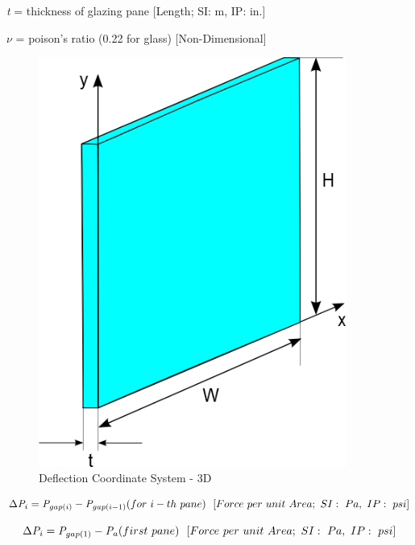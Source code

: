 \emph{t} = thickness of glazing pane {[}Length; SI: m, IP: in.{]}

$\nu$ = poison's ratio (0.22 for glass) {[}Non-Dimensional{]}

\begin{figure}[hbtp] %
\centering
\includegraphics[width=0.9\textwidth, height=0.9\textheight, keepaspectratio=true]{media/image1782.png}
\caption{Deflection Coordinate System - 3D \protect \label{fig:deflection-coordinate-system-3d}}
\end{figure}

\begin{equation}
\emph{\(\Delta\)P\(_{i}\)} = \emph{P\(_{gap(i)}\)} - \emph{P\(_{gap(i-1)}\)} (for~i-th~pane) {~~[}Force~per~unit~Area;~SI:~Pa,~IP:~psi{]}
\label{eq:IGUdPiIthPane}
\end{equation}

\begin{equation}
\emph{\(\Delta\)P\(_{i}\)} = \emph{P\(_{gap(1)}\)} - \emph{P\(_{a}\)} (first~pane) {~~[}Force~per~unit~Area;~SI:~Pa,~IP:~psi{]}
\label{eq:IGUdPiFirstPane}
\end{equation}

